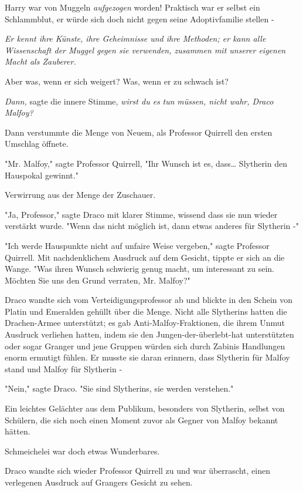 {Harry war von Muggeln \emph{aufgezogen} worden! Praktisch war er selbst ein Schlammblut, er würde sich doch nicht gegen seine Adoptivfamilie stellen -

\emph{Er kennt ihre Künste, ihre Geheimnisse und ihre Methoden; er kann alle Wissenschaft der Muggel gegen sie verwenden, zusammen mit unserer eigenen Macht als Zauberer.}

Aber was, wenn er sich weigert? Was, wenn er zu schwach ist?

\emph{Dann,} sagte die innere Stimme, \emph{wirst du es} \emph{tun} \emph{müssen, nicht wahr, Draco Malfoy?}

Dann verstummte die Menge von Neuem, als Professor Quirrell den ersten Umschlag öffnete.

"Mr. Malfoy," sagte Professor Quirrell, "Ihr Wunsch ist es, dass… Slytherin den Hauspokal gewinnt."

Verwirrung aus der Menge der Zuschauer.

"Ja, Professor," sagte Draco mit klarer Stimme, wissend dass sie nun wieder verstärkt wurde. "Wenn das nicht möglich ist, dann etwas anderes für Slytherin -"

"Ich werde Hauspunkte nicht auf unfaire Weise vergeben," sagte Professor Quirrell. Mit nachdenklichem Ausdruck auf dem Gesicht, tippte er sich an die Wange. "Was ihren Wunsch schwierig genug macht, um interessant zu sein. Möchten Sie uns den Grund verraten, Mr. Malfoy?"

Draco wandte sich vom Verteidigungsprofessor ab und blickte in den Schein von Platin und Emeralden gehüllt über die Menge. Nicht alle Slytherins hatten die Drachen-Armee unterstützt; es gab Anti-Malfoy-Fraktionen, die ihrem Unmut Ausdruck verliehen hatten, indem sie den Jungen-der-überlebt-hat unterstützten oder sogar Granger und jene Gruppen würden sich durch Zabinis Handlungen enorm ermutigt fühlen. Er musste sie daran erinnern, dass Slytherin für Malfoy stand und Malfoy für Slytherin -

"Nein," sagte Draco. "Sie sind Slytherins, sie werden verstehen."

Ein leichtes Gelächter aus dem Publikum, besonders von Slytherin, selbst von Schülern, die sich noch einen Moment zuvor als Gegner von Malfoy bekannt hätten.

Schmeichelei war doch etwas Wunderbares.

Draco wandte sich wieder Professor Quirrell zu und war überrascht, einen verlegenen Ausdruck auf Grangers Gesicht zu sehen.

}
